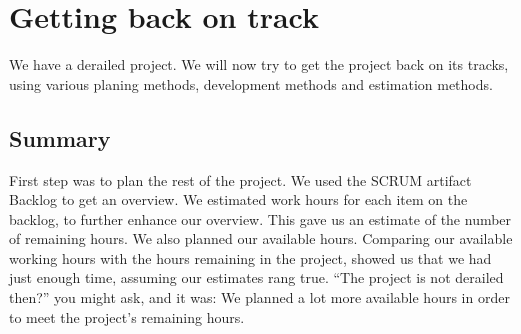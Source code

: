 \section{Getting back on track}
We have a derailed project. We will now try to get the project back on its tracks, using various planing methods, development methods and estimation methods.





\subsection{Summary}
First step was to plan the rest of the project. We used the SCRUM artifact Backlog to get an overview. We estimated work hours for each item on the backlog, to further enhance our overview. This gave us an estimate of the number of remaining hours. We also planned our available hours. Comparing our available working hours with the hours remaining in the project, showed us that we had just enough time, assuming our estimates rang true. ``The project is not derailed then?'' you might ask, and it was: We planned a lot more available hours in order to meet the project's remaining hours.
\newpage